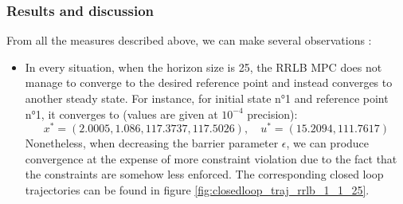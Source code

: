 \documentclass[12pt]{article}
\begin{document}
\subsubsection{Results and discussion}

\noindent From all the measures described above, we can make several observations :

\begin{itemize}[label=\textbullet]
	\item In every situation, when the horizon size is 25, the RRLB MPC does not manage to converge to the desired reference point and instead converges to another steady state.
	For instance, for initial state n°1 and reference point n°1, it converges to (values are given at $10^{-4}$ precision):
	$$x^*=(2.0005, 1.086, 117.3737, 117.5026),\quad u^*=(15.2094, 111.7617)$$
	Nonetheless, when decreasing the barrier parameter $\epsilon$, we can produce convergence at the expense of more constraint violation due to the fact that the constraints are somehow less enforced.
	The corresponding closed loop trajectories can be found in figure \ref{fig:closedloop_traj_rrlb_1_1_25}.


\end{itemize}
\end{document}
